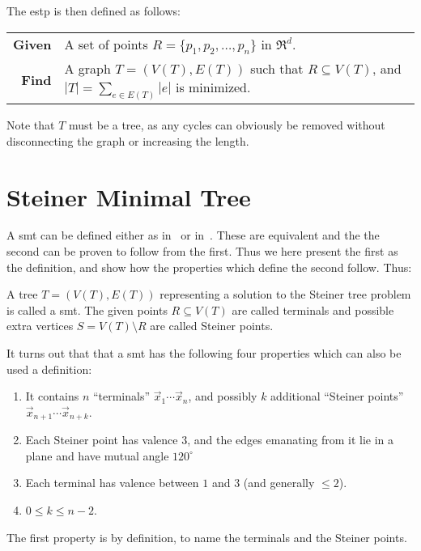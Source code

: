 The \gls{estp} is then defined as follows:
%
\begin{center}
  \begin{tabular}{rp{9cm}}
    \toprule
    \textbf{Given} & A set of points $R = \{ p_1, p_2, \ldots, p_n \}$ in
                     $\Re^d$. \\
    \textbf{Find} & A graph $T = (V(T), E(T))$ such that $R \subseteq V(T)$, and
                    $|T| = \sum_{e \in E(T)} |e|$ is minimized. \\
    \bottomrule
  \end{tabular}
\end{center}
%
Note that $T$ must be a tree, as any cycles can obviously be removed
without disconnecting the graph or increasing the length.

\section{Steiner Minimal Tree}
\label{sec:steiner-minimal-tree}

A \gls{smt} can be defined either as in~\textcite{brazil2015} or
in~\textcite{smith1992}. These are equivalent and the the second can be proven
to follow from the first. Thus we here present the first as the definition, and
show how the properties which define the second follow. Thus:
%
\begin{definition}
  A tree $T = (V(T), E(T))$ representing a solution to the Steiner tree problem
  is called a \acrlong{smt}. The given points $R \subseteq V(T)$ are called
  terminals and possible extra vertices $S = V(T) \setminus R$ are called
  Steiner points.
\end{definition}
%
It turns out that that a \gls{smt} has the following four properties which can
also be used a definition:
%
\begin{enumerate}
\item It contains $n$ ``terminals'' $\vec{x}_1 \cdots \vec{x}_n$, and
 possibly $k$ additional ``Steiner points'' $\vec{x}_{n+1} \cdots
 \vec{x}_{n+k}$.
\item Each Steiner point has valence $3$, and the edges emanating from it lie in a
 plane and have mutual angle $120^{\circ}$
\item Each terminal has valence between $1$ and $3$ (and generally $\le 2$).
\item $0 \le k \le n-2$.
\end{enumerate}
%
The first property is by definition, to name the terminals and the
Steiner points.

